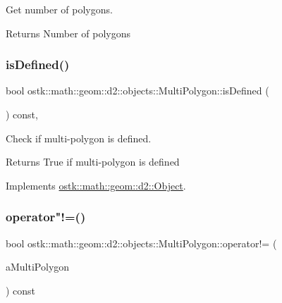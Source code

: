 Get number of polygons. 

\begin{DoxyReturn}{Returns}
Number of polygons 
\end{DoxyReturn}
\mbox{\label{classostk_1_1math_1_1geom_1_1d2_1_1objects_1_1_multi_polygon_a27e84e80acbae4c2a7436a4d5c07b576}} 
\subsubsection{\texorpdfstring{is\+Defined()}{isDefined()}}
{\footnotesize\ttfamily bool ostk\+::math\+::geom\+::d2\+::objects\+::\+Multi\+Polygon\+::is\+Defined (\begin{DoxyParamCaption}{ }\end{DoxyParamCaption}) const\hspace{0.3cm}{\ttfamily [override]}, {\ttfamily [virtual]}}



Check if multi-\/polygon is defined. 

\begin{DoxyReturn}{Returns}
True if multi-\/polygon is defined 
\end{DoxyReturn}


Implements \hyperlink{classostk_1_1math_1_1geom_1_1d2_1_1_object_a456cc7121218d24c1322d0fe54230cc4}{ostk\+::math\+::geom\+::d2\+::\+Object}.

\mbox{\label{classostk_1_1math_1_1geom_1_1d2_1_1objects_1_1_multi_polygon_aa2c66641f9b699bdc4795d93078b8d8a}} 
\subsubsection{\texorpdfstring{operator"!=()}{operator!=()}}
{\footnotesize\ttfamily bool ostk\+::math\+::geom\+::d2\+::objects\+::\+Multi\+Polygon\+::operator!= (\begin{DoxyParamCaption}\item[{const \hyperlink{classostk_1_1math_1_1geom_1_1d2_1_1objects_1_1_multi_polygon}{Multi\+Polygon} \&}]{a\+Multi\+Polygon }\end{DoxyParamCaption}) const}



